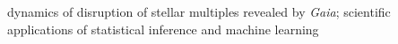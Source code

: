 
\par{
    dynamics of disruption of stellar multiples revealed by {\it Gaia};
    scientific applications of statistical inference and machine learning
}